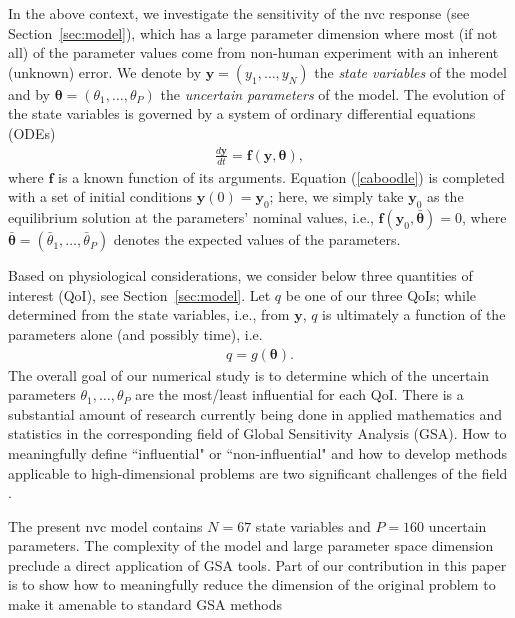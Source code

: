 In the above context, we investigate the sensitivity of  the \gls{nvc} response (see Section~\ref{sec:model}), which has a large parameter dimension where most (if not all) of the parameter values come from non-human experiment  with an inherent (unknown) error. We denote by $\mathbf y = (y_1, \dots, y_N)$  the {\sl state variables} of the model and by $\boldsymbol{\theta} = (\theta_1, \dots, \theta_P)$ the {\sl uncertain parameters} of the model. The evolution of the state variables is governed by a system of ordinary differential equations (ODEs) 
\begin{eqnarray}
\frac {d\boldsymbol{y}}{dt} = \mathbf{f}(\mathbf{y}, \boldsymbol{\theta}), \label{caboodle}
\end{eqnarray}
where $\mathbf{f}$ is a known function of its arguments. Equation (\ref{caboodle}) is completed with a set of initial conditions $\boldsymbol{y}(0) = \boldsymbol{y}_0$;  here, we simply take $\boldsymbol{y}_0$ as the  equilibrium solution at the parameters' nominal values, i.e., $\mathbf f(  \mathbf{y}_0, \bar{\boldsymbol{\theta}}) = 0$, where $ \bar{\boldsymbol{\theta}} = (\bar\theta_1, \dots, \bar\theta_P)$ denotes the expected values of the parameters.

Based on physiological considerations, we consider below three quantities of interest (QoI), see Section~\ref{sec:model}.  Let $q$ be one of our three  QoIs; while determined from the state variables, i.e., from $\mathbf y$, $q$ is  ultimately a function of the parameters alone (and possibly time), i.e.
\begin{eqnarray}
q = g(\boldsymbol{\theta}). \label{qoi}
\end{eqnarray}
The overall goal of our numerical study is to determine  which of the uncertain parameters $\theta_1, \dots, \theta_P$  are the most/least influential for each QoI. There is a substantial amount of research currently being done in applied mathematics and statistics in the corresponding field of Global Sensitivity Analysis  (GSA). How to meaningfully define ``influential" or ``non-influential" and  how to develop methods applicable to high-dimensional problems are two significant challenges of the field \cite{corvar,timegsa,stogsa,iooss,owen,saltelli}. 



The present \gls{nvc} model contains $N=67$ state variables and   $P= 160$ uncertain parameters.
The complexity of the model and large parameter space dimension preclude a direct application of GSA tools. Part of our contribution in this paper is to show how to meaningfully reduce the dimension of the original problem to make it amenable to standard GSA methods

